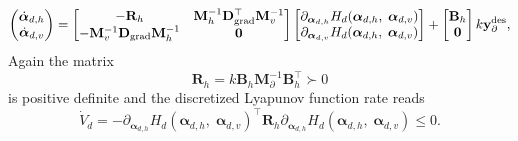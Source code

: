 \begin{equation}\label{eq:pHsys_findim_shwater_ctrlcl}
\begin{pmatrix}
\dot{\bm{\alpha}}_{d, h} \\
\dot{\bm{\alpha}}_{d, v} \\
\end{pmatrix}
= \begin{bmatrix}
-\mathbf{R}_h &  \mathbf{M}_h^{-1} \mathbf{D}_{\operatorname*{grad}}^\top \mathbf{M}_v^{-1} \\
-\mathbf{M}_v^{-1} \mathbf{D}_{\operatorname*{grad}} \mathbf{M}_h^{-1} & \mathbf{0} \\
\end{bmatrix} 
\begin{bmatrix}
\partial_{\bm{\alpha}_{d, h}} H_d(\bm{\alpha}_{d, h},\; \bm{\alpha}_{d, v})\\
\partial_{\bm{\alpha}_{d, v}} H_d(\bm{\alpha}_{d, h},\; \bm{\alpha}_{d, v})\\
\end{bmatrix} + 
\begin{bmatrix}
\mathbf{B}_h \\
\mathbf{0}\\
\end{bmatrix}
k \mathbf{y}_\partial^{\text{des}}, 
\end{equation}
Again the matrix 
\begin{equation*}
	\mathbf{R}_h = k \mathbf{B}_h \mathbf{M}_\partial^{-1} \mathbf{B}_h^\top \succ 0
\end{equation*}
is positive definite and the discretized Lyapunov function rate reads
\begin{equation*}
\dot{V}_d = - \partial_{\bm{\alpha}_{d, h}} H_d(\bm{\alpha}_{d, h},\; \bm{\alpha}_{d, v})^\top \mathbf{R}_h \partial_{\bm{\alpha}_{d, h}} H_d(\bm{\alpha}_{d, h},\; \bm{\alpha}_{d, v}) \le 0.
\end{equation*}

